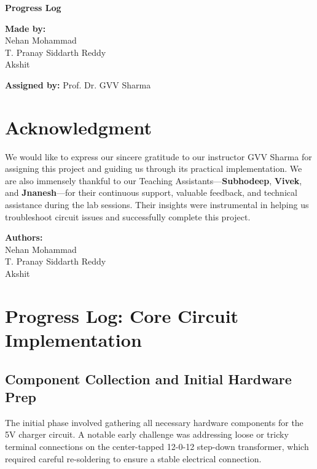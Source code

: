 \documentclass[12pt,a4paper]{article}
\numberwithin{figure}{section}
\begin{document}
\begin{titlepage}
    \centering
    \vspace*{2cm}
    {\Huge \bfseries Progress Log \par}
    \vspace{1.5cm}
    {\Large \textbf{Made by:}\\[0.5em]
    Nehan Mohammad\\[0.3em]
    T. Pranay Siddarth Reddy\\[0.3em]
    Akshit\par}
    \vspace{2cm}
    {\large \textbf{Assigned by:} Prof. Dr. GVV Sharma\par}
    \vfill
\end{titlepage}

\newpage

\section*{Acknowledgment}
We would like to express our sincere gratitude to our instructor GVV Sharma for assigning this project and guiding us through its practical implementation. We are also immensely thankful to our Teaching Assistants—\textbf{Subhodeep}, \textbf{Vivek}, and \textbf{Jnanesh}—for their continuous support, valuable feedback, and technical assistance during the lab sessions. Their insights were instrumental in helping us troubleshoot circuit issues and successfully complete this project.

\vspace{2cm}
\noindent
\textbf{Authors:} \\
Nehan Mohammad \\
T. Pranay Siddarth Reddy \\
Akshit

\newpage

\tableofcontents
\newpage

\section{Progress Log: Core Circuit Implementation}

\subsection{Component Collection and Initial Hardware Prep}
The initial phase involved gathering all necessary hardware components for the 5V charger circuit. A notable early challenge was addressing loose or tricky terminal connections on the center-tapped 12-0-12 step-down transformer, which required careful re-soldering to ensure a stable electrical connection.
\end{document}
